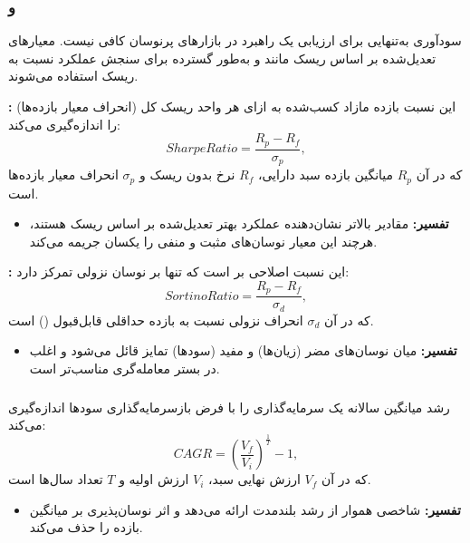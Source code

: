\documentclass[12pt, a4paper]{report}
\begin{document}
\subsubsection{ و }

سودآوری به‌تنهایی برای ارزیابی یک راهبرد در بازارهای پرنوسان کافی نیست. معیارهای تعدیل‌شده بر اساس ریسک مانند  و  به‌طور گسترده برای سنجش عملکرد نسبت به ریسک استفاده می‌شوند.  

\bigskip
\textbf{:}  
این نسبت بازده مازاد کسب‌شده به ازای هر واحد ریسک کل (انحراف معیار بازده‌ها) را اندازه‌گیری می‌کند:
\[
Sharpe Ratio = \frac{R_p - R_f}{\sigma_p},
\]
که در آن $R_p$ میانگین بازده سبد دارایی، $R_f$ نرخ بدون ریسک و $\sigma_p$ انحراف معیار بازده‌ها است.  
\begin{itemize}
    \item \textbf{تفسیر:} مقادیر بالاتر  نشان‌دهنده عملکرد بهتر تعدیل‌شده بر اساس ریسک هستند، هرچند این معیار نوسان‌های مثبت و منفی را یکسان جریمه می‌کند.  
\end{itemize}

\bigskip
\textbf{:}  
این نسبت اصلاحی بر  است که تنها بر نوسان نزولی تمرکز دارد:
\[
Sortino Ratio = \frac{R_p - R_f}{\sigma_d},
\]
که در آن $\sigma_d$ انحراف نزولی نسبت به بازده حداقلی قابل‌قبول () است.  
\begin{itemize}
    \item \textbf{تفسیر:} میان نوسان‌های مضر (زیان‌ها) و مفید (سودها) تمایز قائل می‌شود و اغلب در بستر معامله‌گری مناسب‌تر است.  
\end{itemize}

\subsubsection{}

 رشد میانگین سالانه یک سرمایه‌گذاری را با فرض بازسرمایه‌گذاری سودها اندازه‌گیری می‌کند:
\[
CAGR = \left( \frac{V_f}{V_i} \right)^{\tfrac{1}{T}} - 1,
\]
که در آن $V_f$ ارزش نهایی سبد، $V_i$ ارزش اولیه و $T$ تعداد سال‌ها است.  

\begin{itemize}
    \item \textbf{تفسیر:}  شاخصی هموار از رشد بلندمدت ارائه می‌دهد و اثر نوسان‌پذیری بر میانگین بازده را حذف می‌کند.  
\end{itemize}
\end{document}
